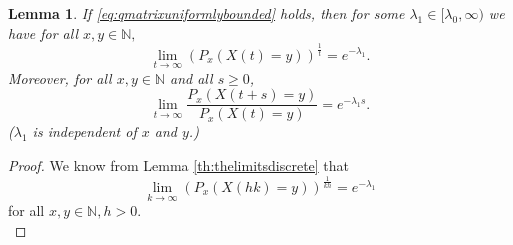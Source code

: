 \documentclass[12pt,a4paper]{scrartcl}
\newtheorem{lemma}[theorem]{Lemma}
\numberwithin{equation}{section}
\newcommand{\N}{\mathbb{N}} %
\begin{document}
\begin{lemma}
If \eqref{eq:qmatrixuniformlybounded} holds, then for some $\lambda_1 \in [\lambda_0, \infty)$ we have for all $x,y \in \N,$
\begin{equation} \label{firstlimitlemma}
\lim_{t \to \infty}\left(P_x\left(X\left(t\right)=y\right)\right)^{\frac{1}{t}} = e^{-\lambda_1}.
\end{equation}
Moreover, for all $x,y \in \N$ and all $s \geq 0$,
\begin{equation} \label{secondlimitlemma}
\lim_{t \to \infty} \frac{P_x\left(X\left(t+s\right)=y\right)}{P_x\left(X\left(t\right)=y\right)} = e^{-\lambda_1 s}.
\end{equation}
($\lambda_1$ is independent of $x$ and $y$.)
\end{lemma}
\begin{proof}
We know from Lemma \ref{th:thelimitsdiscrete} that
\begin{equation} \label{seeverejones}
\lim_{k \to \infty} \left(P_x\left(X\left(hk\right)=y\right) \right)^{\frac{1}{kh}} = e^{-\lambda_1}
\end{equation}
for all $x,y \in \N, h > 0.$ \\[2ex]


\end{proof}
\end{document}
